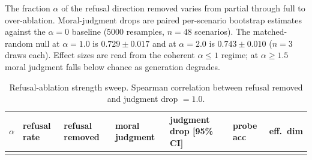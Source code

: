 The fraction \(\alpha\) of the refusal direction removed varies from partial through
full to over-ablation. Moral-judgment drops are paired per-scenario bootstrap
estimates against the \(\alpha{=}0\) baseline (5000 resamples, \(n{=}48\) scenarios).
The matched-random null at \(\alpha{=}1.0\) is \(0.729 \pm 0.017\) and at
\(\alpha{=}2.0\) is \(0.743 \pm 0.010\) (\(n{=}3\) draws each). Effect sizes are read
from the coherent \(\alpha \le 1\) regime; at \(\alpha \ge 1.5\) moral judgment falls
below chance as generation degrades.

\begin{longtable}[]{@{}
  >{\raggedright\arraybackslash}p{}
  >{\raggedright\arraybackslash}p{}
  >{\raggedright\arraybackslash}p{}
  >{\raggedright\arraybackslash}p{}
  >{\raggedright\arraybackslash}p{}
  >{\raggedright\arraybackslash}p{}
  >{\raggedright\arraybackslash}p{}@{}}
\caption{Refusal-ablation strength sweep. Spearman correlation between refusal
removed and judgment drop \(=1.0\).
\label{tab:a-sweep}}\tabularnewline
\toprule\noalign{}
\begin{minipage}[b]{\linewidth}\raggedright
\(\alpha\)
\end{minipage} & \begin{minipage}[b]{\linewidth}\raggedright
refusal rate
\end{minipage} & \begin{minipage}[b]{\linewidth}\raggedright
refusal removed
\end{minipage} & \begin{minipage}[b]{\linewidth}\raggedright
moral judgment
\end{minipage} & \begin{minipage}[b]{\linewidth}\raggedright
judgment drop {[}95\% CI{]}
\end{minipage} & \begin{minipage}[b]{\linewidth}\raggedright
probe acc
\end{minipage} & \begin{minipage}[b]{\linewidth}\raggedright
eff.~dim
\end{minipage} \\
\midrule\noalign{}
\endfirsthead
\toprule\noalign{}
\begin{minipage}[b]{\linewidth}\raggedright

\end{minipage}
\end{longtable}
